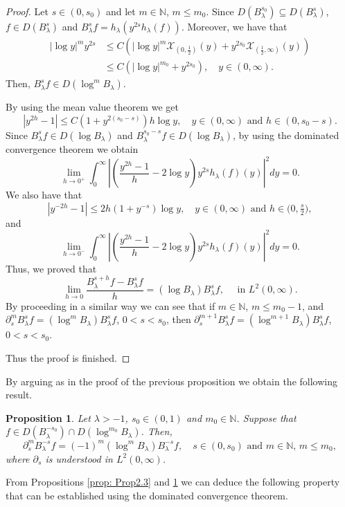\documentclass[10pt,a4paper]{amsart}
\newtheorem{prop}[thm]{Proposition}
\numberwithin{equation}{section}
\begin{document}
\begin{proof}
    Let $s\in (0,s_0)$ and let $m\in \mathbb N$, $m \leq m_0$. Since $D( B_\lambda^{s_0})\subseteq D(B_\lambda^s)$, $f\in D(B_\lambda^s)$ and $B_\lambda^sf=h_\lambda (y^{2s}h_\lambda (f))$. Moreover, we have that
    \begin{align*}
        |\log y|^m y^{2s}&\leq C\left(|\log y|^m\mathcal X_{(0,\tfrac12)}(y)+y ^{2s_0}\mathcal X_{(\tfrac12,\infty)}(y)\right)\\
        &\leq C\left(|\log y|^{m_0}+y^{2s_0}\right),\quad y\in (0,\infty).
    \end{align*}
Then, $B_\lambda^sf\in D(\log^m B_\lambda)$.

By using the mean value theorem we get
\[
|y^{2h}-1|\leq C\left(1+y^{2(s_0-s)}\right)h\log y,\quad y\in (0,\infty)\mbox{ and }h\in (0,s_0-s).
\]
Since $B_\lambda^sf\in D(\log B_\lambda)$ and $B_\lambda^{s_0-s}f\in D(\log B_\lambda)$, by using the dominated convergence theorem we obtain
\[
\lim_{h\rightarrow 0^+}\int_0^\infty \left|\left(\frac{y^{2h}-1}{h}-2\log y\right)y^{2s}h_\lambda (f)(y)\right|^2dy=0.
\]
We also have that
\[
|y^{-2h}-1|\leq 2h(1+y^{-s})\log y,\quad y\in (0,\infty)\mbox{ and }h\in \big(0,\tfrac{s}{2}\big),
\]
and
\[
\lim_{h\rightarrow 0^-}\int_0^\infty \left|\left(\frac{y^{2h}-1}{h}-2\log y\right)y^{2s}h_\lambda (f)(y)\right|^2dy=0.
\]
Thus, we proved that
\[
\lim_{h\rightarrow 0}\frac{B_\lambda^{s+h}f-B_\lambda^sf}{h}=(\log B_\lambda)B_\lambda^sf,\quad \mbox{ in }L^2(0,\infty).
\]
By proceeding in a similar way we can see that if $m\in \mathbb N$, $m\leq m_0-1$, and $\partial_s^m B_\lambda^sf=(\log^m B_\lambda)B_\lambda^sf$, $0<s<s_0$, then $\partial_s^{m+1}B_\lambda^sf=(\log^{m+1}B_\lambda)B_\lambda^s f$, $0<s<s_0$.

Thus the proof is finished.
\end{proof}
By arguing as in the proof of the previous proposition we obtain the following result.

\begin{prop}\label{prop: Prop2.4}
    Let $\lambda >-1$, $s_0\in (0,1)$ and $m_0\in \mathbb N$. Suppose that $f\in D(B_\lambda^{-s_0})\cap D(\log^{m_0}B_\lambda)$. Then, 
    \[
    \partial_s^m B_\lambda^{-s}f=(-1)^m(\log^m B_\lambda)B_\lambda^{-s}f,\quad s\in (0,s_0)\mbox{ and }m\in \mathbb N,\,m\leq m_0,
    \] 
    where $\partial_s$ is understood in $L^2(0,\infty)$.
\end{prop}

From Propositions \ref{prop: Prop2.3} and \ref{prop: Prop2.4} we can deduce the following property that can be established using the dominated convergence theorem.
\end{document}
